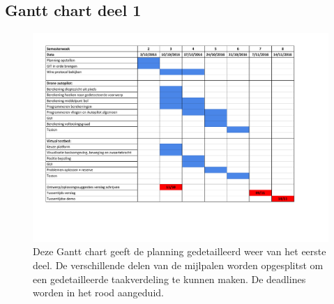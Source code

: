 \subsection{Gantt chart deel 1} 
	\begin{figure}[H]
		\begin{center}
			\includegraphics[scale=0.60]{Planning_Deel1.pdf}
		\end{center}
		\caption{Deze Gantt chart geeft de planning gedetailleerd weer van het eerste deel. De verschillende delen van de mijlpalen worden opgesplitst om een gedetailleerde taakverdeling te kunnen maken. De deadlines worden in het rood aangeduid.}
	\end{figure}
